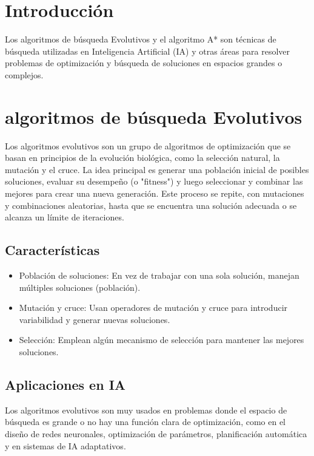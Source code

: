 \documentclass[12pt]{article}
\begin{document}
\section{Introducción}
Los algoritmos de búsqueda Evolutivos y el algoritmo A* son técnicas de búsqueda utilizadas en Inteligencia Artificial (IA) y 
otras áreas para resolver problemas de optimización y búsqueda de soluciones en espacios grandes o complejos.

\section{algoritmos de búsqueda Evolutivos}

Los algoritmos evolutivos son un grupo de algoritmos de optimización que se basan en principios de la evolución biológica, como la selección natural, 
la mutación y el cruce. La idea principal es generar una población inicial de posibles soluciones, evaluar su desempeño (o "fitness") y luego seleccionar y 
combinar las mejores para crear una nueva generación. Este proceso se repite, con mutaciones y combinaciones aleatorias, hasta que se encuentra una solución adecuada 
o se alcanza un límite de iteraciones.

\subsection{Características}

\begin{itemize}
    \item Población de soluciones: En vez de trabajar con una sola solución, manejan múltiples soluciones (población).
    \item Mutación y cruce: Usan operadores de mutación y cruce para introducir variabilidad y generar nuevas soluciones.
    \item Selección: Emplean algún mecanismo de selección para mantener las mejores soluciones.
\end{itemize}

\subsection{Aplicaciones en IA}

Los algoritmos evolutivos son muy usados en problemas donde el espacio de búsqueda es grande o no hay una función clara de optimización, 
como en el diseño de redes neuronales, optimización de parámetros, planificación automática y en sistemas de IA adaptativos.
\end{document}
